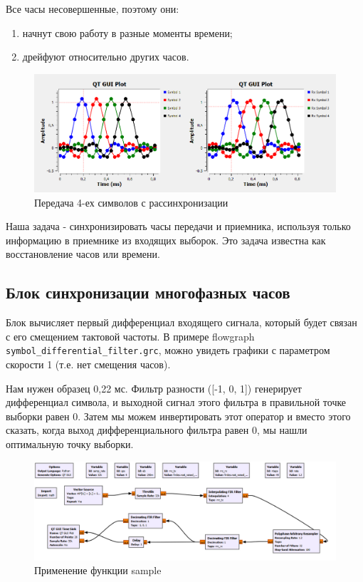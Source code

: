 \documentclass[a4paper, 14pt]{extarticle}
\begin{document}
    Все часы несовершенные, поэтому они:
    \begin{enumerate}
        \item начнут свою работу в разные моменты времени;
        \item дрейфуют относительно других часов.
    \end{enumerate}

    \begin{figure}[H]
        \centering
        \includegraphics[width=0.8\linewidth]{diff_clocks}
        \caption{Передача 4-ех символов с рассинхронизации}
        \label{fig:diff_clocks}
    \end{figure}

    Наша задача - синхронизировать часы передачи и приемника, используя только информацию в приемнике из входящих выборок.
    Это задача известна как восстановление часов или времени.

    \subsection{Блок синхронизации многофазных часов}

    Блок вычисляет первый дифференциал входящего сигнала, который будет связан с его смещением тактовой частоты.
    В примере flowgraph \texttt{symbol\_differential\_filter.grc}, можно увидеть графики с параметром скорости 1 (т.е. нет смещения часов).

    Нам нужен образец 0,22 мс. Фильтр разности ([-1, 0, 1]) генерирует дифференциал символа, и выходной сигнал этого фильтра в правильной точке выборки равен 0.
    Затем мы можем инвертировать этот оператор и вместо этого сказать, когда выход дифференциального фильтра равен 0, мы нашли оптимальную точку выборки.

    \begin{figure}[H]
        \centering
        \includegraphics[width=0.8\linewidth]{flowgraph_diff_filter}
        \caption{Применение функции sample}
        \label{fig:flowgraph_diff_filter}
    \end{figure}
\end{document}
